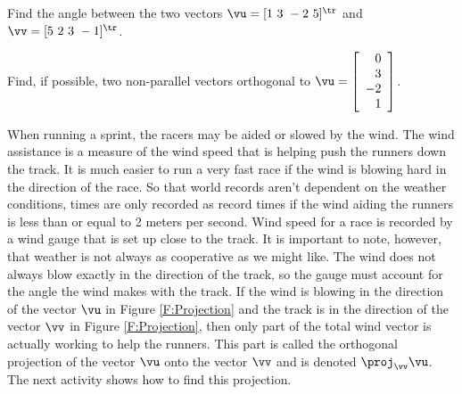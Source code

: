 


\begin{activity} \hfill
	\ba
	\item Find the angle between the two vectors $\vu = [1 \ 3 \ -2 \ 5]^{\tr}$ and $\vv = [5 \  2 \  3  \ -1]^{\tr}$.
	
	
	
	\item Find, if possible, two non-parallel vectors orthogonal to $\vu = \left[ \begin{array}{r} 0\\3\\-2\\1 \end{array} \right]$.
	
	
	
	\ea
\end{activity}

\label{sec:orthog_proj}

When running a sprint, the racers may be aided or slowed by the wind. The wind assistance is a measure of the wind speed that is helping push the runners down the track. It is much easier to run a very fast race if the wind is blowing hard in the direction of the race. So that world records aren't dependent on the weather conditions, times are only recorded as record times if the wind aiding the runners is less than or equal to 2 meters per second. Wind speed for a race is recorded by a wind gauge that is set up close to the track. It is important to note, however, that weather is not always as cooperative as we might like. The wind does not always blow exactly in the direction of the track, so the gauge must account for the angle the wind makes with the track. If the wind is blowing in the direction of the vector $\vu$ in Figure \ref{F:Projection} and the track is in the direction of the vector $\vv$ in Figure \ref{F:Projection}, then only part of the total wind vector is actually working to help the runners. This part is called the orthogonal projection of the vector $\vu$ onto the vector $\vv$ and is denoted $\proj_{\vv} \vu$. The next activity shows how to find this projection.

